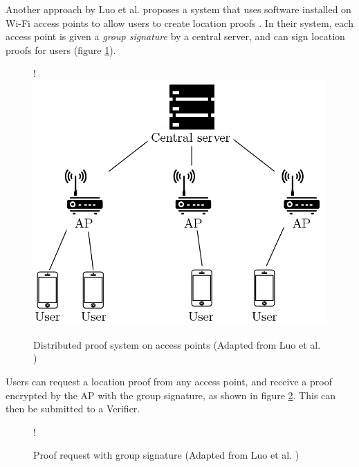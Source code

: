 Another approach by Luo et al. proposes a system that uses software installed on Wi-Fi access points to allow users to create location proofs \cite{luo}. In their system, each access point is given a \textit{group signature} by a central server, and can sign location proofs for users (figure \ref{fig:luo_diagram}).

\begin{figure}[H]
\begin{center}
 {!} {\includegraphics{diagrams/ap_paper.png}}
\caption[Distributed proof system on access points]{Distributed proof system on access points (Adapted from Luo et al. \cite{luo})}
\label{fig:luo_diagram}
\end{center}
\end{figure}

Users can request a location proof from any access point, and receive a proof encrypted by the AP with the group signature, as shown in figure \ref{fig:luo_transaction}. This can then be submitted to a Verifier.

\begin{figure}[H]
\begin{center}
 {!} {}
\caption[Proof request with group signature]{Proof request with group signature (Adapted from Luo et al. \cite{luo})}
\label{fig:luo_transaction}
\end{center}
\end{figure}

